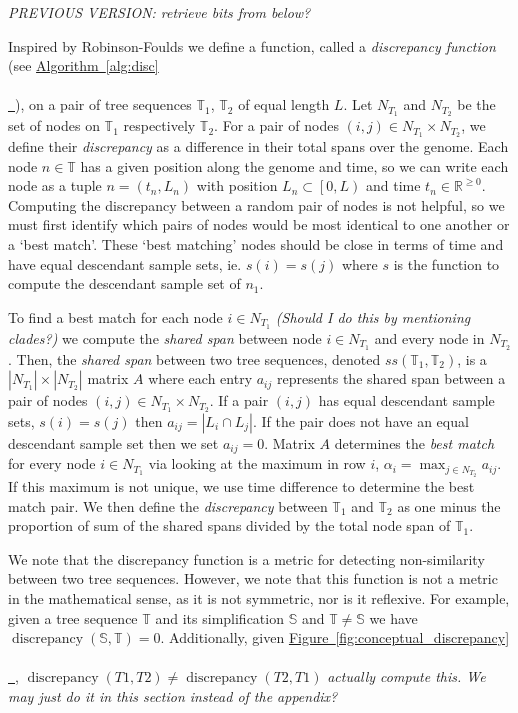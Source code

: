 \documentclass[10pt,twoside,lineno]{gsajnl}
\newcommand{\R}{\mathbb{R}}
\newcommand{\T}{\mathbb{T}}
\newcommand{\comment}[1]{{\color{violet} \it #1}}
\newcommand{\algorithmref}[2][]{%
	\hyperref[{#2}]{%
		Algorithm~\ref*{#2}%
		\ifx\\#1\\%
		\else
		\,#1%
		\fi
	}%
}
\newcommand*{\figref}[2][]{%
	\hyperref[{#2}]{%
		Figure~\ref*{#2}%
		\ifx\\#1\\%
		\else
		\,#1%
		\fi
	}%
}
\begin{document}
\comment{PREVIOUS VERSION: retrieve bits from below?}

Inspired by Robinson-Foulds we define a function, called a \textit{discrepancy function} (see \algorithmref{alg:disc}), on a pair of tree sequences $\T_1$, $\T_2$ of equal length $L$.
Let $N_{T_1}$ and $N_{T_2}$ be the set of nodes on $\T_1$ respectively $\T_2$.
For a pair of nodes $(i,j)\in N_{T_1}\times N_{T_2}$, we define their \textit{discrepancy} as a difference in their total spans over the genome.
Each node $n\in\T$ has a given position along the genome and time, 
so we can write each node as a tuple $n = (t_n, L_n)$ with position $L_n\subset \left[0,L\right)$ and time $t_n\in \R^{\geq 0}$.
Computing the discrepancy between a random pair of nodes is not helpful, 
so we must first identify which pairs of nodes would be most identical to one another or a `best match'.
These `best matching' nodes should be close in terms of time and have equal descendant sample sets,
ie. $s(i) = s(j)$ where $s$ is the function to compute the descendant sample set of $n_1$.

To find a best match for each node $i\in N_{T_1}$ \comment{(Should I do this by mentioning clades?)}
we compute the \textit{shared span} between node $i\in N_{T_1}$ and every node in $N_{T_2}$.
Then, the \textit{shared span} between two tree sequences, denoted $ss(\T_1,\T_2)$, is a $|N_{T_1}|\times |N_{T_2}|$ matrix $A$
where each entry $a_{ij}$ represents the shared span between a pair of nodes $(i,j)\in N_{T_1}\times N_{T_2}$.
If a pair $(i,j)$ has equal descendant sample sets, $s(i) = s(j)$
then $a_{ij} = |L_i \cap L_j|$.
If the pair does not have an equal descendant sample set then we set $a_{ij}=0$.
Matrix $A$ determines the \textit{best match} for every node $i\in N_{T_1}$
via looking at the maximum in row $i$, $\alpha_i = \max_{j\in N_{T_2}} a_{ij}$.
If this maximum is not unique, we use time difference to determine the best match pair.
We then define the \textit{discrepancy} between $\T_1$ and $\T_2$ as 
one minus the proportion of sum of the shared spans divided by the total node span of $\T_1$.

We note that the discrepancy function is a metric for detecting non-similarity between two tree sequences. However, we note that this function is not a metric in the mathematical sense, as it is not symmetric, nor is it reflexive. For example, given a tree sequence $\T$ and its simplification $\mathbb{S}$ and $\T\neq\mathbb{S}$ we have $\operatorname{discrepancy}(\mathbb{S}, \T)=0$. Additionally, given \figref{fig:conceptual_discrepancy}, $\operatorname{discrepancy}(T1, T2) \neq \operatorname{discrepancy}(T2, T1)$ \comment{actually compute this. We may just do it in this section instead of the appendix?}
 
\end{document}
